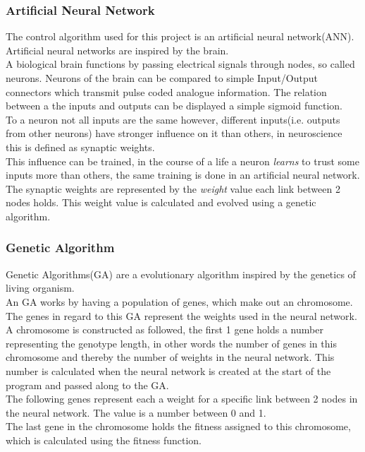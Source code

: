 \subsubsection{Artificial Neural Network}
The control algorithm used for this project is an artificial neural network(ANN).
Artificial neural networks are inspired by the brain. \\
A biological brain functions by passing electrical signals through nodes, so called neurons. Neurons of the brain can be compared to simple Input/Output connectors which transmit pulse coded analogue information. The relation between a the inputs and outputs can be displayed a simple sigmoid function\cite{Hopfield}.\\
To a neuron not all inputs are the same however, different inputs(i.e. outputs from other neurons) have stronger influence on it than others, in neuroscience this is defined as synaptic weights. \\
This influence can be trained, in the course of a life a neuron \textit{learns} to trust some inputs more than others, the same training is done in an artificial neural network. The synaptic weights are represented by the \textit{weight} value each link between 2 nodes holds. This weight value is calculated and evolved using a genetic algorithm. 

\subsubsection{Genetic Algorithm}
Genetic Algorithms(GA) are a evolutionary algorithm inspired by the genetics of living organism. \\
An GA works by having a population  of genes, which make out an chromosome. The genes in regard to this GA represent the weights used in the neural network. \\
A chromosome is constructed as followed, the first 1 gene holds a number representing the genotype length, in other words the number of genes in this chromosome and thereby the number of weights in the neural network. This number is calculated when the neural network is created at the start of the program and passed along to the GA.\\
The following genes represent each a weight for a specific link between 2 nodes in the neural network. The value is a number between 0 and 1. \\
The last gene in the chromosome holds the fitness assigned to this chromosome, which is calculated using the fitness function.\\

